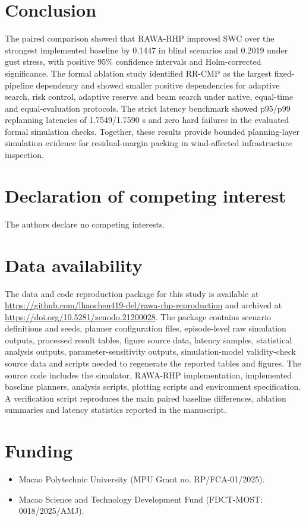 \documentclass[preprint,12pt]{elsarticle}
\begin{document}
\section{Conclusion}

The paired comparison showed that RAWA-RHP improved SWC over the strongest implemented baseline by 0.1447 in blind scenarios and 0.2019 under gust stress, with positive 95\% confidence intervals and Holm-corrected significance. The formal ablation study identified RR-CMP as the largest fixed-pipeline dependency and showed smaller positive dependencies for adaptive search, risk control, adaptive reserve and beam search under native, equal-time and equal-evaluation protocols. The strict latency benchmark showed p95/p99 replanning latencies of 1.7549/1.7590 s and zero hard failures in the evaluated formal simulation checks. Together, these results provide bounded planning-layer simulation evidence for residual-margin packing in wind-affected infrastructure inspection.

\section*{Declaration of competing interest}
The authors declare no competing interests.

\section*{Data availability}
The data and code reproduction package for this study is available at \url{https://github.com/lhaochen419-del/rawa-rhp-reproduction} and archived at \url{https://doi.org/10.5281/zenodo.21200028}. The package contains scenario definitions and seeds, planner configuration files, episode-level raw simulation outputs, processed result tables, figure source data, latency samples, statistical analysis outputs, parameter-sensitivity outputs, simulation-model validity-check source data and scripts needed to regenerate the reported tables and figures. The source code includes the simulator, RAWA-RHP implementation, implemented baseline planners, analysis scripts, plotting scripts and environment specification. A verification script reproduces the main paired baseline differences, ablation summaries and latency statistics reported in the manuscript.
\section*{Funding}
\begin{itemize}
\item Macao Polytechnic University (MPU Grant no. RP/FCA-01/2025).
\item \begin{sloppypar}Macao Science and Technology Development Fund (FDCT-MOST:\allowbreak{} 0018/\allowbreak{}2025/\allowbreak{}AMJ).\end{sloppypar}
\end{itemize}
\end{document}
